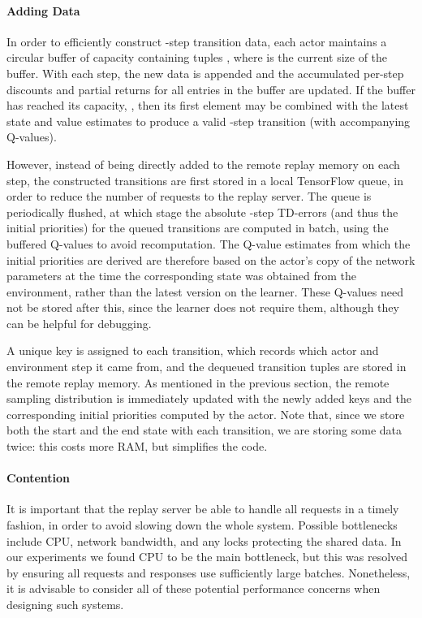 \documentclass{article} \PassOptionsToPackage{usenames,dvipsnames}{xcolor}
\begin{document}
\paragraph{Adding Data}

In order to efficiently construct -step transition data, each actor maintains a circular buffer of capacity  containing tuples , where  is the current size of the buffer. With each step, the new data is appended and the accumulated per-step discounts  and partial returns  for all entries in the buffer are updated. If the buffer has reached its capacity, , then its first element may be combined with the latest state  and value estimates  to produce a valid -step transition (with accompanying Q-values).

However, instead of being directly added to the remote replay memory on each step, the constructed transitions  are first stored in a local TensorFlow queue, in order to reduce the number of requests to the replay server. The queue is periodically flushed, at which stage the absolute -step TD-errors (and thus the initial priorities) for the queued transitions are computed in batch, using the buffered Q-values to avoid recomputation. The Q-value estimates from which the initial priorities are derived are therefore based on the actor's copy of the network parameters at the time the corresponding state was obtained from the environment, rather than the latest version on the learner. These Q-values need not be stored after this, since the learner does not require them, although they can be helpful for debugging.

A unique key is assigned to each transition, which records which actor and environment step it came from, and the dequeued transition tuples are stored in the remote replay memory. As mentioned in the previous section, the remote sampling distribution is immediately updated with the newly added keys and the corresponding initial priorities computed by the actor. Note that, since we store both the start and the end state with each transition, we are storing some data twice: this costs more RAM, but simplifies the code.

\paragraph{Contention}

It is important that the replay server be able to handle all requests in a timely fashion, in order to avoid slowing down the whole system. Possible bottlenecks include CPU, network bandwidth, and any locks protecting the shared data. In our experiments we found CPU to be the main bottleneck, but this was resolved by ensuring all requests and responses use sufficiently large batches. Nonetheless, it is advisable to consider all of these potential performance concerns when designing such systems.
\end{document}
